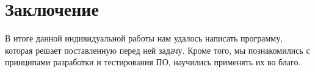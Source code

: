 \section{Заключение}
\par
В итоге данной индивидуальной работы нам удалось написать программу, которая
решает поставленную перед ней задачу. Кроме того, мы познакомились с
принципами разработки и тестирования ПО, научились применять их во благо.
\pagebreak
